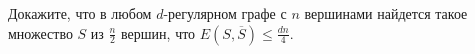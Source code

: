 Докажите, что в любом $d$-регулярном графе с $n$ вершинами найдется такое множество $S$ из $\frac{n}{2}$ вершин, что
$E(S, \overline{S}) \le \frac{d n}{4}$. 